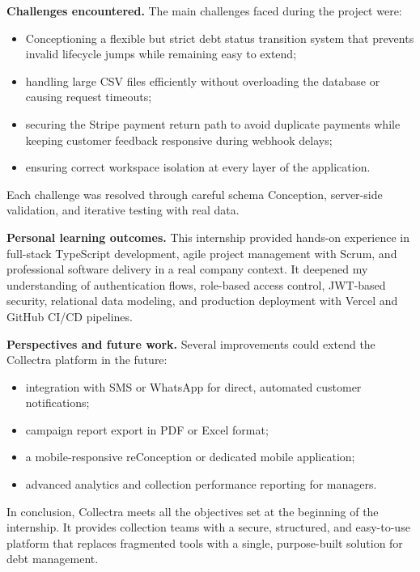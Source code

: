 \documentclass[12pt,a4paper]{report}
\begin{document}
\textbf{Challenges encountered.}
The main challenges faced during the project were:
\begin{itemize}
  \item Conceptioning a flexible but strict debt status transition system that prevents
        invalid lifecycle jumps while remaining easy to extend;
  \item handling large CSV files efficiently without overloading the database or
        causing request timeouts;
  \item securing the Stripe payment return path to avoid duplicate payments while
        keeping customer feedback responsive during webhook delays;
  \item ensuring correct workspace isolation at every layer of the application.
\end{itemize}
Each challenge was resolved through careful schema Conception, server-side validation,
and iterative testing with real data.

\textbf{Personal learning outcomes.}
This internship provided hands-on experience in full-stack TypeScript development,
agile project management with Scrum, and professional software delivery in a real
company context.
It deepened my understanding of authentication flows, role-based access control,
JWT-based security, relational data modeling, and production deployment with Vercel
and GitHub CI/CD pipelines.

\enlargethispage{2\baselineskip}
\textbf{Perspectives and future work.}
Several improvements could extend the Collectra platform in the future:
\begin{itemize}
  \item integration with SMS or WhatsApp for direct, automated customer notifications;
  \item campaign report export in PDF or Excel format;
  \item a mobile-responsive reConception or dedicated mobile application;
  \item advanced analytics and collection performance reporting for managers.
\end{itemize}

In conclusion, Collectra meets all the objectives set at the beginning of the
internship.
It provides collection teams with a secure, structured, and easy-to-use platform
that replaces fragmented tools with a single, purpose-built solution for debt
management.

\renewcommand{\bibname}{Reference List}
\clearpage
{}
\addcontentsline{toc}{chapter}{\bibname}
\end{document}
